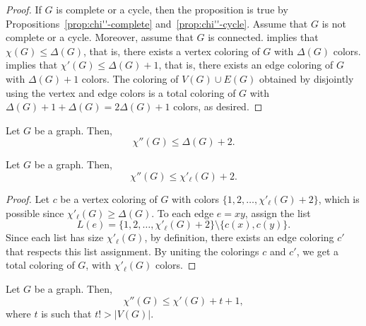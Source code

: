 \begin{proof}
    If \(G\) is complete or a cycle, then the proposition is true by Propositions~\ref{prop:chi''-complete} and~\ref{prop:chi''-cycle}.
    Assume that \(G\) is not complete or a cycle.
    Moreover, assume that \(G\) is connected.
     implies that \(\chi(G) \leq \Delta(G)\),
    that is, there exists a vertex coloring of \(G\) with \(\Delta(G)\) colors.
     implies that \(\chi'(G) \leq \Delta(G) + 1\),
    that is, there exists an edge coloring of \(G\) with \(\Delta(G) + 1\) colors.
    The coloring of \(V(G) \cup E(G)\) obtained by disjointly using the vertex and edge colors is a total coloring of \(G\) with \(\Delta(G) + 1 + \Delta(G) = 2\Delta(G) + 1\) colors, as desired.
\end{proof}

\begin{conjecture}[Vizing, 1964]
    Let \(G\) be a graph.
    Then,
    \begin{equation}
        \chi''(G) \leq \Delta(G) + 2.
    \end{equation}
\end{conjecture}

\begin{lemma}
    Let \(G\) be a graph.
    Then,
    \begin{equation}
        \chi''(G) \leq \chi'_\ell(G) + 2.
    \end{equation}
\end{lemma}

\begin{proof}
    Let \(c\) be a vertex coloring of \(G\) with colors \(\{1, 2, \dots, \chi'_\ell(G)+2\}\),
    which is possible since \(\chi'_\ell(G) \geq \Delta(G)\).
    To each edge \(e = xy\), assign the list
    \begin{equation}
        L(e) = \{1, 2, \dots, \chi'_\ell(G) + 2\} \setminus \{c(x), c(y)\}.
    \end{equation}
    Since each list has size \(\chi'_\ell(G)\), by definition,
    there exists an edge coloring \(c'\) that respects this list assignment.
    By uniting the colorings \(c\) and \(c'\), we get a total coloring of \(G\), with \(\chi'_\ell(G)\) colors.
\end{proof}

\begin{theorem} \label{thm:mcdiairmid-reed}
    Let \(G\) be a graph.
    Then,
    \begin{equation}
        \chi''(G) \leq \chi'(G) + t + 1,
    \end{equation}
    where \(t\) is such that \(t! > |V(G)|\).
\end{theorem}

